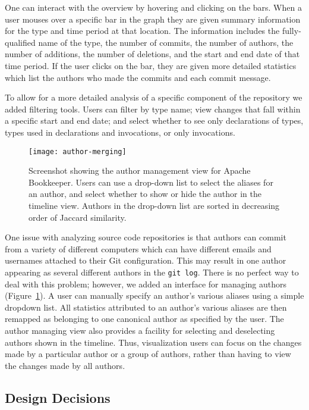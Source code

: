 One can interact with the overview by hovering and clicking on the bars. When a user mouses over a specific bar in the graph they are given summary information for the type and time period at that location. The information includes the fully-qualified name of the type, the number of commits, the number of authors, the number of additions, the number of deletions, and the start and end date of that time period. If the user clicks on the bar, they are given more detailed statistics which list the authors who made the commits and each commit message. 

To allow for a more detailed analysis of a specific component of the repository we added filtering tools. Users can filter by type name; view changes that fall within a specific start and end date; and select whether to see only declarations of types, types used in declarations and invocations, or only invocations.

\begin{figure}[tb]
\centering
\texttt{[image: author-merging]}
\caption{Screenshot showing the author management view for Apache Bookkeeper. Users can use a drop-down list to select the aliases for an author, and select whether to show or hide the author in the timeline view. Authors in the drop-down list are sorted in decreasing order of Jaccard similarity.}
\label{fig:author-merging}
\end{figure}

One issue with analyzing source code repositories is that authors can commit from a variety of different computers which can have different emails and usernames attached to their Git configuration. This may result in one author appearing as several different authors in the \texttt{git log}. There is no perfect way to deal with this problem; however, we added an interface for managing authors (Figure~\ref{fig:author-merging}). A user can manually specify an author's various aliases using a simple dropdown list. All statistics attributed to an author's various aliases are then remapped as belonging to one canonical author as specified by the user. The author managing view also provides a facility for selecting and deselecting authors shown in the timeline. Thus, visualization users can focus on the changes made by a particular author or a group of authors, rather than having to view the changes made by all authors.

\subsection{Design Decisions}

